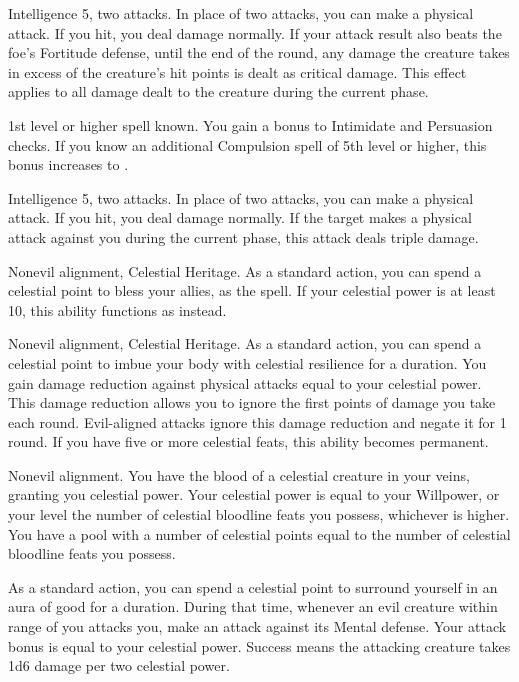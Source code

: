 \featpre Intelligence 5, two attacks.
\featben In place of two attacks, you can make a physical attack.
If you hit, you deal damage normally.
If your attack result also beats the foe's Fortitude defense, until the end of the round, any damage the creature takes in excess of the creature's hit points is dealt as critical damage.
This effect applies to all damage dealt to the creature during the current phase.

\featpre 1st level or higher  spell known.
\featben You gain a  bonus to Intimidate and Persuasion checks.
If you know an additional Compulsion spell of 5th level or higher, this bonus increases to .

\featpre Intelligence 5, two attacks.
\featben In place of two attacks, you can make a physical attack.
If you hit, you deal damage normally.
If the target makes a physical attack against you during the current phase, this attack deals triple damage.

\featpres
Nonevil alignment, Celestial Heritage.
\featben As a standard action, you can spend a celestial point to bless your allies, as the  spell.
If your celestial power is at least 10, this ability functions as  instead.

\featpres
Nonevil alignment, Celestial Heritage.
\featben As a standard action, you can spend a celestial point to imbue your body with celestial resilience for a \durshort duration.
You gain damage reduction against physical attacks equal to your celestial power.
This damage reduction allows you to ignore the first points of damage you take each round.
Evil-aligned attacks ignore this damage reduction and negate it for 1 round.
If you have five or more celestial feats, this ability becomes permanent.

\featpre Nonevil alignment.
\featben You have the blood of a celestial creature in your veins, granting you celestial power.
Your celestial power is equal to your Willpower, or your level \add the number of celestial bloodline feats you possess, whichever is higher.
You have a pool with a number of celestial points equal to the number of celestial bloodline feats you possess.

As a standard action, you can spend a celestial point to surround yourself in an aura of good for a \durshort duration.
During that time, whenever an evil creature within \rngclose range of you attacks you, make an attack against its Mental defense.
Your attack bonus is equal to your celestial power.
Success means the attacking creature takes 1d6 damage per two celestial power.

